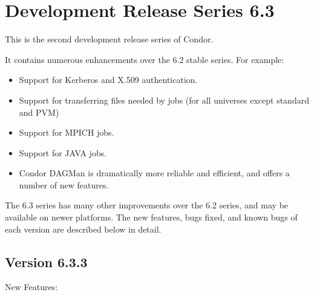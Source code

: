 \section{\label{sec:History-6-3}Development Release Series 6.3}

This is the second development release series of Condor.

It contains numerous enhancements over the 6.2 stable series.
For example:

\begin{itemize}

\item Support for Kerberos and X.509 authentication.

\item Support for transferring files needed by jobs (for all universes
except standard and PVM)

\item Support for MPICH jobs.

\item Support for JAVA jobs.

\item 
Condor DAGMan is dramatically more reliable and efficient, and offers
a number of new features.

\end{itemize}

The 6.3 series has many other improvements over the 6.2 series, and
may be available on newer platforms.  The new features, bugs fixed,
and known bugs of each version are described below in detail.


\subsection{\label{sec:New-6-3-3}Version 6.3.3}

\noindent New Features:


